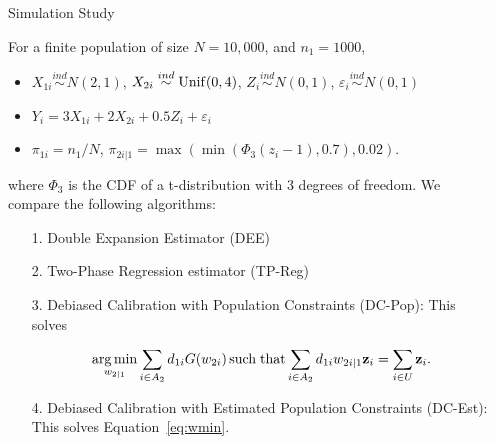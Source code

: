 \documentclass[final]{beamer}
\DeclareMathOperator*{\argmin}{arg\,min}
\DeclareMathOperator*{\suchthat}{such\; that}
\newlength{\sepwidth}
\newlength{\colwidth}
\newcommand{\separatorcolumn}{\begin{column}{\sepwidth}\end{column}}
\begin{document}
\begin{frame}[t]
\begin{columns}[t]
\separatorcolumn

\begin{column}{\colwidth}

  \begin{block}{Simulation Study}

  For a finite population of size $N = 10,000$, and $n_1 = 1000$,

  \begin{itemize}
    \item $X_{1i} \stackrel{ind}{\sim} N(2, 1)$,
      $X_{2i} \stackrel{ind}{\sim} \rm{Unif}(0, 4)$,
      $Z_{i} \stackrel{ind}{\sim} N(0, 1)$,
      $\varepsilon_i \stackrel{ind}{\sim} N(0, 1)$
    \item $Y_{i} = 3 X_{1i} + 2 X_{2i} + 0.5 Z_i + \varepsilon_i$
    \item $\pi_{1i} = n_1 / N$,
      $\pi_{2i|1} = \max(\min(\Phi_3(z_{i} - 1), 0.7), 0.02)$.
  \end{itemize}

  where $\Phi_3$ is the CDF of a t-distribution with 3 degrees of freedom. We
  compare the following algorithms:

  \begin{itemize}
    \item[1.] Double Expansion Estimator (DEE)
    \item[2.] Two-Phase Regression estimator (TP-Reg)
    \item[3.] Debiased Calibration with Population Constraints (DC-Pop): This 
      solves 

    \begin{equation*}
      \argmin_{w_{2|1}} \sum_{i \in A_2} d_{1i} G(w_{2i}) \suchthat
      \sum_{i \in A_2} d_{1i} w_{2i|1} {\bf z}_i = \sum_{i \in U} {\bf z}_i.
    \end{equation*}

    \item[4.] Debiased Calibration with Estimated Population Constraints (DC-Est):
      This solves Equation~\eqref{eq:wmin}.
  \end{itemize}

  \begin{table}[ht!]
    \centering
  
  \caption{This table shows the results of the simulation study. It displays the
  Bias, RMSE, empirical 95\% confidence interval, and a t-statistic assessing the
  unbiasedness of each estimator for the estimators: DEE, TP-Reg, DC-Pop, and
  DC-Est.}
  \label{tab:tpdc-mean}
  \end{table}
  \end{block}


\end{column}
\end{columns}
\end{frame}
\end{document}
